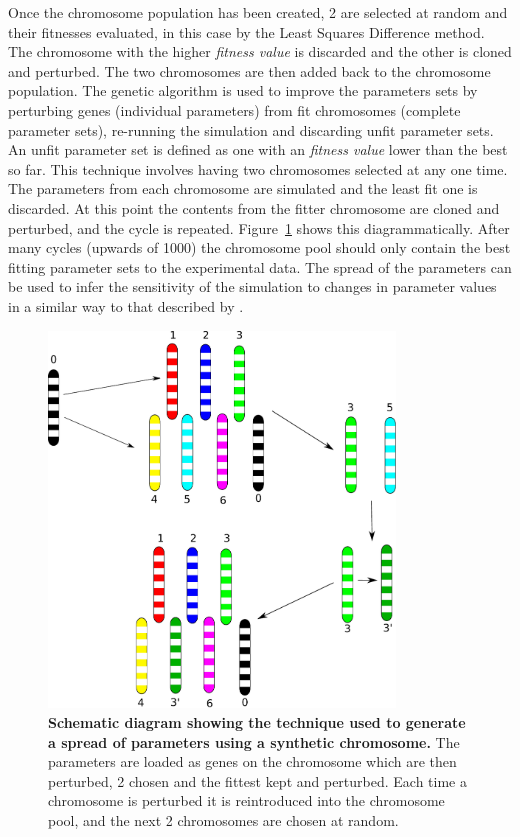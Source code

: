 Once the chromosome population has been created, 2 are selected at random and their fitnesses evaluated, in this case by the Least Squares Difference method. The chromosome with the higher \textit{fitness value} is discarded and the other is cloned and perturbed. The two chromosomes are then added back to the chromosome population. The genetic algorithm is used to improve the parameters sets by perturbing genes (individual parameters) from fit chromosomes (complete parameter sets), re-running the simulation and discarding unfit parameter sets. An unfit parameter set is defined as one with an \textit{fitness value} lower than the best so far. This technique involves having two chromosomes selected at any one time. The parameters from each chromosome are simulated and the least fit one is discarded. At this point the contents from the fitter chromosome are cloned and perturbed, and the cycle is repeated. Figure~\ref{fig:sa_spread} shows this diagrammatically. After many cycles (upwards of 1000) the chromosome pool should only contain the best fitting parameter sets to the experimental data. The spread of the parameters can be used to infer the sensitivity of the simulation to changes in parameter values in a similar way to that described by \citet{Toni2009}.\\
\begin{figure}[tbp]
\begin{center}
\includegraphics[height=10cm]{./03-parameterestimationmethodologies/data/sa_spread.pdf}
\end{center}
\caption[{Schematic diagram showing the technique used to generate a spread of parameters using a synthetic chromosome.}]{{\bf Schematic diagram showing the technique used to generate a spread of parameters using a synthetic chromosome.} The parameters are loaded as genes on the chromosome which are then perturbed, 2 chosen and the fittest kept and perturbed. Each time a chromosome is perturbed it is reintroduced into the chromosome pool, and the next 2 chromosomes are chosen at random.
\label{fig:sa_spread}}
\end{figure}
